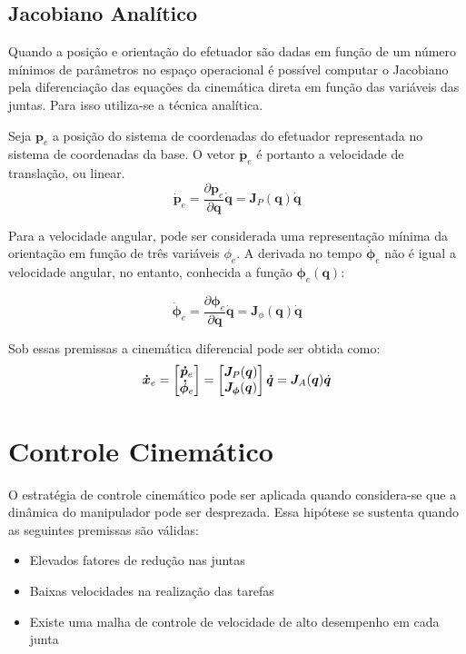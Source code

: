 \subsection{Jacobiano Analítico}
Quando a posição e orientação do efetuador são dadas em função de um número mínimos de parâmetros no espaço operacional é possível computar o Jacobiano pela diferenciação das equações da cinemática direta em função das variáveis das juntas.
Para isso utiliza-se a técnica analítica.

Seja $\bm{p}_e$ a posição do sistema de coordenadas do efetuador representada no sistema de coordenadas da base. O vetor $\dot{\bm{p}}_e$ é portanto a velocidade de translação, ou linear.
\begin{equation} \label{eq:jacob_pos}
\dot{\bm{p}}_e = \frac{\partial \bm{p}_e }{\partial \bm{q}} \dot{\bm{q}} = \bm{J}_P (\bm{q}) \dot{\bm{q}} 
\end{equation}

Para a velocidade angular, pode ser considerada uma representação mínima da orientação em função de três variáveis $\phi_e$. 
A derivada no tempo $\dot{\bm{\phi}}_e$ não é igual a velocidade angular, no entanto, conhecida a função $\bm{\phi}_e(\bm{q})$:

\begin{equation} \label{eq:jacob_or}
\dot{\bm{\phi}}_e = \frac{\partial \bm{\phi}_e}{\partial \bm{q}} \bm{\dot{q}} = \bm{J}_{\phi}(\bm{q})\bm{\dot{q}}
\end{equation}

Sob essas premissas a cinemática diferencial pode ser obtida como:
\begin{equation} \label{eq:jacoba}
\bm{\dot{x}}_e = \begin{bmatrix}\bm{\dot{p}}_e \\ \bm{\dot{\phi}}_e\end{bmatrix} = \begin{bmatrix}\bm{J}_P(\bm{q}) \\ \bm{J_\phi}(\bm{q})\end{bmatrix} \bm{\dot{q}} = \bm{J}_A (\bm{q}) \dot{\bm{q}}
\end{equation}

 
\section{Controle Cinemático}
\label{sec:controle_cinematico}
O estratégia de controle cinemático pode ser aplicada quando considera-se que a dinâmica do manipulador pode ser desprezada. Essa hipótese se sustenta quando as seguintes premissas são válidas:
\begin{itemize}
\item Elevados fatores de redução nas juntas
\item Baixas velocidades na realização das tarefas
\item Existe uma malha de controle de velocidade de alto desempenho em cada junta
\end{itemize}

